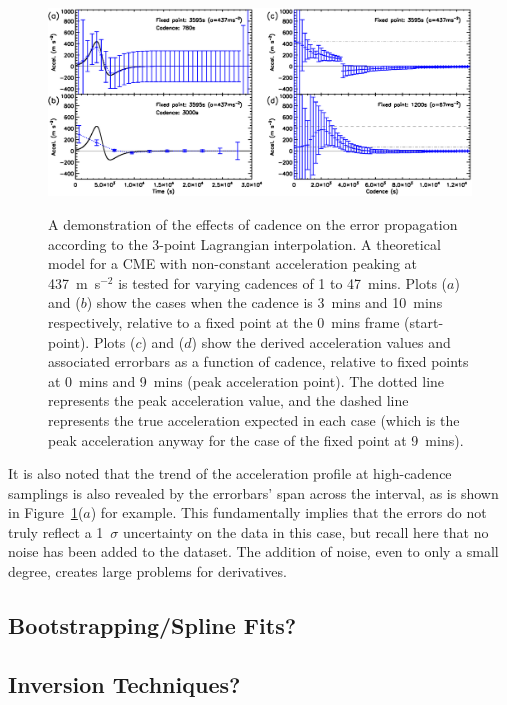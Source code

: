 \documentclass[structabstract]{aa}
\begin{document}
\begin{figure}[!t]
\centering
{\includegraphics[scale=0.55, trim=0 30 0 10, clip=true]{images/fig_cadence_4landscape.eps}}
\caption{A demonstration of the effects of cadence on the error propagation according to the 3-point Lagrangian interpolation. A theoretical model for a CME with non-constant acceleration peaking at 437~m~s$^{-2}$ is tested for varying cadences of 1 to 47~mins. Plots ($a$) and ($b$) show the cases when the cadence is 3~mins and 10~mins respectively, relative to a fixed point at the 0~mins frame (start-point). Plots ($c$) and ($d$) show the derived acceleration values and associated errorbars as a function of cadence, relative to fixed points at 0~mins and 9~mins (peak acceleration point). The dotted line represents the peak acceleration value, and the dashed line represents the true acceleration expected in each case (which is the peak acceleration anyway for the case of the fixed point at 9~mins).}
\label{fig_cadence_4}
\end{figure}

It is also noted that the trend of the acceleration profile at high-cadence samplings is also revealed by the errorbars' span across the interval, as is shown in Figure~\ref{fig_cadence_4}($a$) for example. This fundamentally implies that the errors do not truly reflect a 1~$\sigma$ uncertainty on the data in this case, but recall here that no noise has been added to the dataset. The addition of noise, even to only a small degree, creates large problems for derivatives.

\subsection{Bootstrapping/Spline Fits?}

\subsection{Inversion Techniques?}
\end{document}
